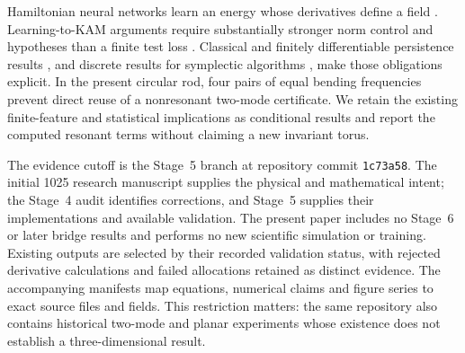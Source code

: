 Hamiltonian neural networks learn an energy whose derivatives define a field \citep{Greydanus2019}. Learning-to-KAM arguments require substantially stronger norm control and hypotheses than a finite test loss \citep{Chen2022}. Classical and finitely differentiable persistence results \citep{Poschel2001,Bounemoura2020}, and discrete results for symplectic algorithms \citep{Shang1999}, make those obligations explicit. In the present circular rod, four pairs of equal bending frequencies prevent direct reuse of a nonresonant two-mode certificate. We retain the existing finite-feature and statistical implications as conditional results and report the computed resonant terms without claiming a new invariant torus.

The evidence cutoff is the Stage~5 branch at repository commit \texttt{1c73a58}. The initial 1025 research manuscript supplies the physical and mathematical intent; the Stage~4 audit identifies corrections, and Stage~5 supplies their implementations and available validation. The present paper includes no Stage~6 or later bridge results and performs no new scientific simulation or training. Existing outputs are selected by their recorded validation status, with rejected derivative calculations and failed allocations retained as distinct evidence. The accompanying manifests map equations, numerical claims and figure series to exact source files and fields. This restriction matters: the same repository also contains historical two-mode and planar experiments whose existence does not establish a three-dimensional result.
